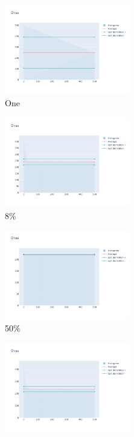 \documentclass[12pt, fleqn]{report}                             %
\theoremstyle{break}                                            %
\begin{document}
      \begin{figure}[ht!]
        \centering
        \begin{subfigure}[b]{0.4\linewidth}
          \includegraphics[width=0.6\textwidth]{Images/13/dia-a.png}
          \caption{One}
        \end{subfigure}
        \begin{subfigure}[b]{0.4\linewidth}
          \includegraphics[width=0.6\textwidth]{Images/13/dia-b.png}
          \caption{8\%}
        \end{subfigure}
        \begin{subfigure}[b]{0.4\linewidth}
          \includegraphics[width=0.6\textwidth]{Images/13/dia-c.png}
          \caption{50\%}
        \end{subfigure}
        \begin{subfigure}[b]{0.4\linewidth}
          \includegraphics[width=0.6\textwidth]{Images/13/dia-d.png}

\end{subfigure}
\end{figure}
\end{document}
